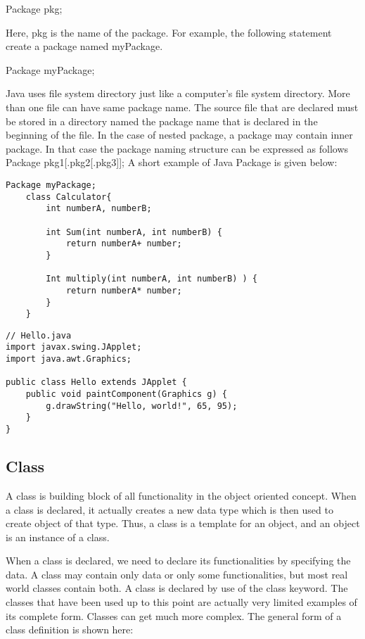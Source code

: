 \documentclass[12pt]{report}
\begin{document}
Package pkg;

Here, pkg is the name of the package. For example, the following statement create a package named myPackage.
 
Package myPackage; 

Java uses file system directory just like a computer’s file system directory. More than one file can have same package name. The source file that are declared must be stored in a directory named the package name that is declared in the beginning of the file. 
In the case of nested package, a package may contain inner package. In that case the package naming structure can be expressed as follows 
Package pkg1[.pkg2[.pkg3]]; 
A short example of Java Package is given below:

\begin{lstlisting}
Package myPackage;
	class Calculator{
		int numberA, numberB;
			
		int Sum(int numberA, int numberB) {
			return numberA+ number;
		}
		
		Int multiply(int numberA, int numberB) ) {
			return numberA* number;
		}
	}

\end{lstlisting}
\begin{lstlisting}
// Hello.java
import javax.swing.JApplet;
import java.awt.Graphics;

public class Hello extends JApplet {
    public void paintComponent(Graphics g) {
        g.drawString("Hello, world!", 65, 95);
    }    
}
\end{lstlisting}

\subsection{Class}
A class is building block of all functionality in the object oriented concept. When a class is declared, it actually creates a new data type which is then used to create object of that type. Thus, a class is a template for an object, and an object is an instance of a class. 


When a class is declared, we need to declare its functionalities by specifying the data. A class may contain only data or only some functionalities, but most real world classes contain both. A class is declared by use of the class keyword. The classes that have been used up to this point are actually very limited examples of its complete form. Classes can get much more complex. The general form of a class definition is shown here:
\end{document}
